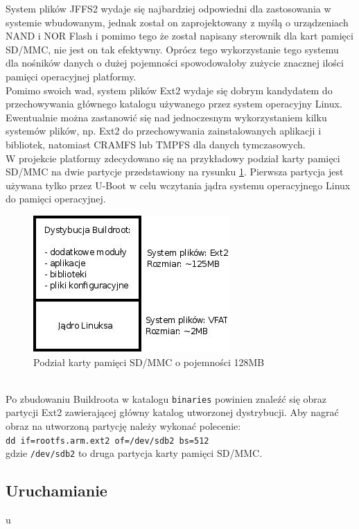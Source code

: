 \documentclass[a4paper,12pt]{book}
\begin{document}
				System plików JFFS2 wydaje się najbardziej odpowiedni dla zastosowania w systemie wbudowanym, jednak został on zaprojektowany z myślą o urządzeniach NAND i NOR Flash i pomimo tego że został napisany sterownik dla kart pamięci SD/MMC, nie jest on tak efektywny. Oprócz tego wykorzystanie tego systemu dla nośników danych o dużej pojemności spowodowałoby zużycie znacznej ilości pamięci operacyjnej platformy.\\
				Pomimo swoich wad, system plików Ext2 wydaje się dobrym kandydatem do przechowywania głównego katalogu używanego przez system operacyjny Linux. Ewentualnie można zastanowić się nad jednoczesnym wykorzystaniem kilku systemów plików, np. Ext2 do przechowywania zainstalowanych aplikacji i bibliotek, natomiast CRAMFS lub TMPFS dla danych tymczasowych.\\
				W projekcie platformy zdecydowano się na przykładowy podział karty pamięci SD/MMC na dwie partycje przedstawiony na rysunku \ref{fig:sd_mmc}. Pierwsza partycja jest używana tylko przez U-Boot w celu wczytania jądra systemu operacyjnego Linux do pamięci operacyjnej.\\
				\begin{figure}[h!]
					\begin{center}
						\includegraphics[scale=0.6]{img/sd_mmc.jpg}
						\caption{Podział karty pamięci SD/MMC o pojemności 128MB}
						\label{fig:sd_mmc}
					\end{center}
				\end{figure}\\			
				Po zbudowaniu Buildroota w katalogu \texttt{binaries} powinien znaleźć się obraz partycji Ext2 zawierającej główny katalog utworzonej dystrybucji. Aby nagrać obraz na utworzoną partycję należy wykonać polecenie:\\
				\texttt{dd if=rootfs.arm.ext2 of=/dev/sdb2 bs=512}\\
				gdzie \texttt{/dev/sdb2} to druga partycja karty pamięci SD/MMC.
			\subsection{Uruchamianie}
				u
\end{document}
